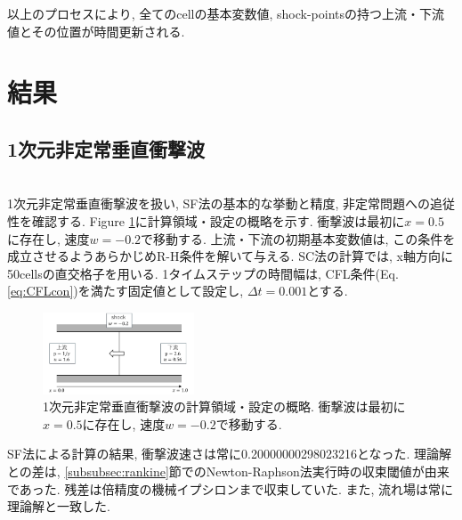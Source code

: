 \documentclass[a4j]{jarticle}
\begin{document}
以上のプロセスにより, 全てのcellの基本変数値, shock-pointsの持つ上流・下流値とその位置が時間更新される.

\section{結果}
\subsection{1次元非定常垂直衝撃波}\label{subsec:1D}
\mbox{}\\[-3.0ex]

1次元非定常垂直衝撃波を扱い, SF法の基本的な挙動と精度, 非定常問題への追従性を確認する.
Figure \ref{fig:1Dsituation}に計算領域・設定の概略を示す.
衝撃波は最初に$x=0.5$に存在し, 速度$w=-0.2$で移動する.
上流・下流の初期基本変数値は, この条件を成立させるようあらかじめR-H条件を解いて与える.
SC法の計算では, x軸方向に50cellsの直交格子を用いる.
1タイムステップの時間幅は, CFL条件(Eq.\ref{eq:CFLcon})を満たす固定値として設定し, $\Delta t = 0.001$とする.
\begin{figure}[H]
    \begin{center}
        \includegraphics[width=0.4\textwidth]{1Dsituation.pdf}
    \end{center}
    \caption{1次元非定常垂直衝撃波の計算領域・設定の概略.
    衝撃波は最初に$x=0.5$に存在し, 速度$w=-0.2$で移動する.}
    \label{fig:1Dsituation}
\end{figure}
SF法による計算の結果, 衝撃波速さは常に0.20000000298023216となった.
理論解との差は, \ref{subsubsec:rankine}節でのNewton-Raphson法実行時の収束閾値が由来であった. 
残差は倍精度の機械イプシロンまで収束していた. また, 流れ場は常に理論解と一致した.
\end{document}
